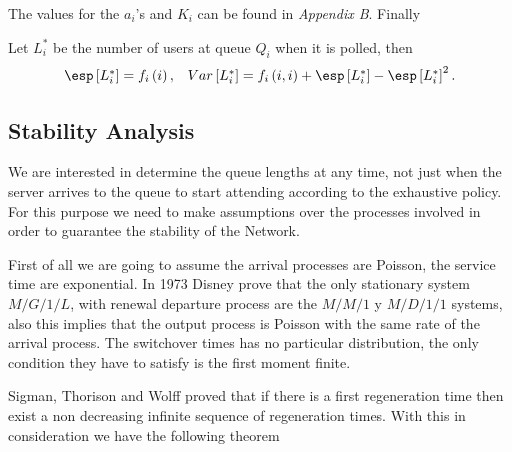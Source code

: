The values for the $a_{i}$'s and $K_{i}$ can be found in \textit{Appendix B}. Finally 

\begin{Def}
Let $L_{i}^{*}$ be the number of users at queue $Q_{i}$ when it is polled, then
\begin{eqnarray}
\begin{array}{cc}
\esp\left[L_{i}^{*}\right]=f_{i}\left(i\right), &
Var\left[L_{i}^{*}\right]=f_{i}\left(i,i\right)+\esp\left[L_{i}^{*}\right]-\esp\left[L_{i}^{*}\right]^{2}.
\end{array}
\end{eqnarray}
\end{Def}

%
\subsection{Stability Analysis}
%

We are interested in determine the queue lengths at any time, not just when the server arrives to the queue to start attending according to the exhaustive policy. For this purpose we need to make assumptions over the processes involved in order to guarantee the stability of the Network.



First of all we are going to assume the arrival processes are Poisson, the service time are exponential. In 1973 Disney \cite{Disney} prove that the only stationary system $M/G/1/L$, with renewal departure process are the $M/M/1$ y $M/D/1/1$ systems, also this implies that the output process is Poisson with the same rate of the arrival process. The switchover times has no particular distribution, the only condition they have to satisfy is the first moment finite.

Sigman, Thorison and Wolff \cite{Sigman2} proved that if there is a first regeneration time then exist a non decreasing infinite sequence of regeneration times. With this in consideration we have the following theorem 


